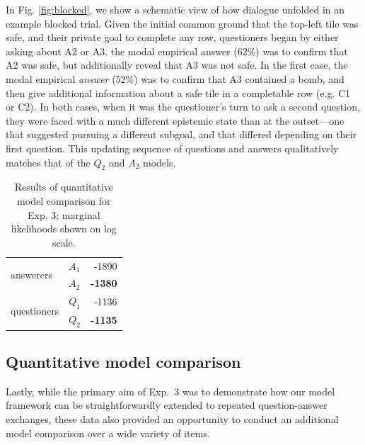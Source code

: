 \documentclass[11pt, floatsintext]{apa6}
\begin{document}
In Fig. \ref{fig:blocked}, we show a schematic view of how dialogue unfolded in an example blocked trial.
Given the initial common ground that the top-left tile was safe, and their private goal to complete any row, questioners began by either asking about A2 or A3.
the modal empirical answer (62\%) was to confirm that A2 was safe, but additionally reveal that A3 was not safe.
In the first case, the modal empirical \emph{answer} (52\%) was to confirm that A3 contained a bomb, and then give additional information about a safe tile in a completable row (e.g. C1 or C2).  
In both cases, when it was the questioner's turn to ask a second question, they were faced with a much different epistemic state than at the outset---one that suggested pursuing a different subgoal, and that differed depending on their first question. 
This updating sequence of questions and answers qualitatively matches that of the $Q_2$ and $A_2$ models.

\begin{table}[]
\begin{center}
\begin{tabular}{@{}llr@{}}
\toprule
\multirow{2}{*}{answerers} & $A_1$ & -1890 \\ \cmidrule(l){2-3} 
 & $A_2$ & \textbf{-1380} \\ \midrule
\multirow{2}{*}{questioners} & $Q_1$ & -1136  \\ \cmidrule(l){2-3} 
 & $Q_2$ & \textbf{-1135} \\ \bottomrule
\end{tabular}
\end{center}
\caption{Results of quantitative model comparison for Exp. 3; marginal likelihoods shown on log scale.}
\label{table:exp3likelihoods}
\end{table}

\subsection{Quantitative model comparison}

Lastly, while the primary aim of Exp.~3 was to demonstrate how our model framework can be straightforwardly extended to repeated question-answer exchanges, these data also provided an opportunity to conduct an additional model comparison over a wide variety of items.
\end{document}
